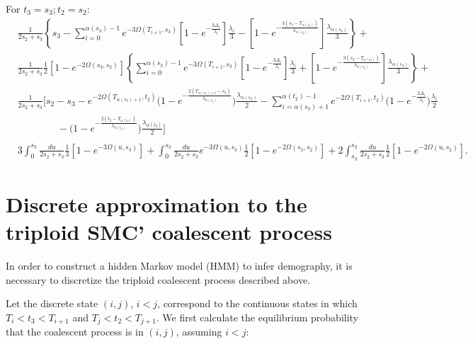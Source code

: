 \documentclass{article}
\begin{document}
For $t_3=s_3; t_2=s_2$:
\begin{align*}
    &\frac{1}{2s_2+s_3}
    \left\{s_3 - \sum_{i=0}^{\alpha(s_3)-1}e^{-3\Omega(T_{i+1},s_3)}
        \left[1-e^{-\frac{3\Delta_i}{\lambda_i}}\right]\frac{\lambda_i}{3}-
    \left[1-e^{-\frac{3\left(s_3-T_{\alpha(s_3)}\right)}{\lambda_{\alpha(s_3)}}}\right]
        \frac{\lambda_{\alpha(s_3)}}{3}\right\}+\\
    &\frac{1}{2s_2+s_3}\frac{1}{2}\left[1-e^{-2\Omega(s_3,s_2)}\right]
    \left\{\sum_{i=0}^{\alpha(s_3)-1}e^{-3\Omega(T_{i+1},s_3)}
        \left[1-e^{-\frac{3\Delta_i}{\lambda_i}}\right]\frac{\lambda_i}{3}+
    \left[1-e^{-\frac{3\left(s_3-T_{\alpha(s_3)}\right)}{\lambda_{\alpha(s_3)}}}\right]
        \frac{\lambda_{\alpha(s_3)}}{3}\right\}+\\
        &\frac{1}{2s_2+s_3}\Bigg[s_2-s_3-e^{-2\Omega(T_{\alpha(s_3)+1},t_2)}\Bigg(1-e^{-\frac{2\left(T_{\alpha(s_3)+1}-s_3\right)}{\lambda_{\alpha(s_3)}}}\Bigg)\frac{\lambda_{\alpha(s_3)}}{2}-\sum_{i=\alpha(s_3)+1}^{\alpha(t_2)-1}e^{-2\Omega\left(T_{i+1},t_2\right)}\Bigg(1-e^{-\frac{2\Delta_i}{\lambda_i}}\Bigg)\frac{\lambda_i}{2}\\
    &\qquad\qquad-\Bigg(1-e^{-\frac{2\left(t_2-T_{\alpha(t_2)}\right)}{\lambda_{\alpha(t_2)}}}\Bigg)\frac{\lambda_{\alpha(t_2)}}{2}
    \Bigg]\\
    \\
    &3\int_0^{s_3}\frac{du}{2s_2+s_3}\frac{1}{3}\left[1-e^{-3\Omega(u,s_3)}\right]+\int_0^{s_3}\frac{du}{2s_2+s_3}e^{-3\Omega(u,s_3)}\frac{1}{2}\left[1-e^{-2\Omega(s_3,s_2)}\right]+2\int_{s_3}^{s_2}\frac{du}{2s_2+s_3}\frac{1}{2}\left[1-e^{-2\Omega(u,s_2)}\right].
\end{align*}

\section{Discrete approximation to the triploid SMC' coalescent process}

In order to construct a hidden Markov model (HMM) to infer demography, it is
necessary to discretize the triploid coalescent process described above.

Let the discrete state $(i,j)$, $i<j$, correspond to the continuous states in which ${T_i
< t_3 < T_{i+1}}$ and ${T_j < t_2 < T_{j+1}}$. We first calculate the equilibrium
probability that the coalescent process is in $(i,j)$, assuming $i<j$:
\end{document}
